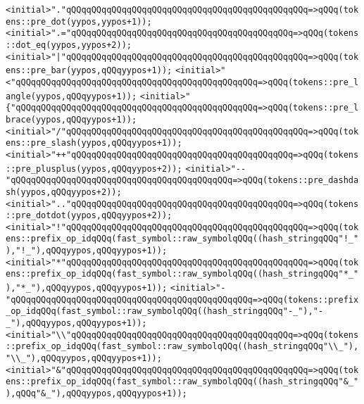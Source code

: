 \verb|<initial>"."qQQqqQQqqQQqqQQqqQQqqQQqqQQqqQQqqQQqqQQqqQQqqQQq=>qQQq(tokens::pre_dot(yypos,yypos+1));|\newline
\verb|<initial>".="qQQqqQQqqQQqqQQqqQQqqQQqqQQqqQQqqQQqqQQqqQQq=>qQQq(tokens::dot_eq(yypos,yypos+2));|\newline
\verb|<initial>"|\verb#|"qQQqqQQqqQQqqQQqqQQqqQQqqQQqqQQqqQQqqQQqqQQqqQQq=>qQQq(tokens::pre_bar(yypos,qQQqyypos+1));#\newline
\verb|<initial>"<"qQQqqQQqqQQqqQQqqQQqqQQqqQQqqQQqqQQqqQQqqQQqqQQq=>qQQq(tokens::pre_langle(yypos,qQQqyypos+1));|\newline
\verb|<initial>"{"qQQqqQQqqQQqqQQqqQQqqQQqqQQqqQQqqQQqqQQqqQQqqQQq=>qQQq(tokens::pre_lbrace(yypos,qQQqyypos+1));|\newline
\verb|<initial>"/"qQQqqQQqqQQqqQQqqQQqqQQqqQQqqQQqqQQqqQQqqQQqqQQq=>qQQq(tokens::pre_slash(yypos,qQQqyypos+1));|\newline
\verb|<initial>"++"qQQqqQQqqQQqqQQqqQQqqQQqqQQqqQQqqQQqqQQqqQQq=>qQQq(tokens::pre_plusplus(yypos,qQQqyypos+2));|\newline
\verb|<initial>"--"qQQqqQQqqQQqqQQqqQQqqQQqqQQqqQQqqQQqqQQqqQQq=>qQQq(tokens::pre_dashdash(yypos,qQQqyypos+2));|\newline
\verb|<initial>".."qQQqqQQqqQQqqQQqqQQqqQQqqQQqqQQqqQQqqQQqqQQq=>qQQq(tokens::pre_dotdot(yypos,qQQqyypos+2));|\newline
\verb|<initial>"!"qQQqqQQqqQQqqQQqqQQqqQQqqQQqqQQqqQQqqQQqqQQqqQQq=>qQQq(tokens::prefix_op_idqQQq(fast_symbol::raw_symbolqQQq((hash_stringqQQq"!_"),"!_"),qQQqyypos,qQQqyypos+1));|\newline
\verb|<initial>"*"qQQqqQQqqQQqqQQqqQQqqQQqqQQqqQQqqQQqqQQqqQQqqQQq=>qQQq(tokens::prefix_op_idqQQq(fast_symbol::raw_symbolqQQq((hash_stringqQQq"*_"),"*_"),qQQqyypos,qQQqyypos+1));|\newline
\verb|<initial>"-"qQQqqQQqqQQqqQQqqQQqqQQqqQQqqQQqqQQqqQQqqQQqqQQq=>qQQq(tokens::prefix_op_idqQQq(fast_symbol::raw_symbolqQQq((hash_stringqQQq"-_"),"-_"),qQQqyypos,qQQqyypos+1));|\newline
\verb|<initial>"\\"qQQqqQQqqQQqqQQqqQQqqQQqqQQqqQQqqQQqqQQqqQQq=>qQQq(tokens::prefix_op_idqQQq(fast_symbol::raw_symbolqQQq((hash_stringqQQq"\\_"),"\\_"),qQQqyypos,qQQqyypos+1));|\newline
\verb|<initial>"&"qQQqqQQqqQQqqQQqqQQqqQQqqQQqqQQqqQQqqQQqqQQqqQQq=>qQQq(tokens::prefix_op_idqQQq(fast_symbol::raw_symbolqQQq((hash_stringqQQq"&_"),qQQq"&_"),qQQqyypos,qQQqyypos+1));|\newline
